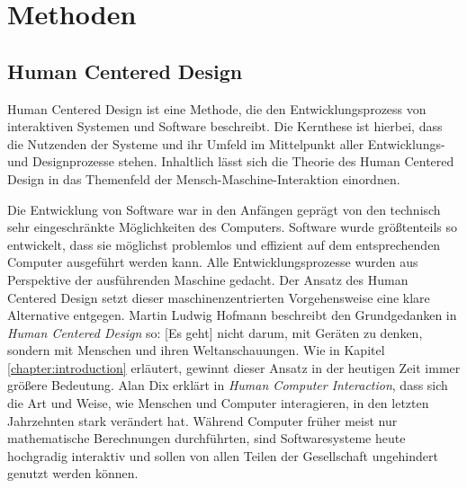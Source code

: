 \chapter{Methoden}
\label{chapter:methods}

\section{Human Centered Design}
Human Centered Design ist eine Methode, die den Entwicklungsprozess von
interaktiven Systemen und Software beschreibt. Die Kernthese ist hierbei, dass
die Nutzenden der Systeme und ihr Umfeld im Mittelpunkt aller Entwicklungs\hyphen\space und
Designprozesse stehen. Inhaltlich lässt sich die Theorie des Human Centered
Design in das Themenfeld der Mensch-Maschine-Interaktion
einordnen\cite{HMI-HCD}.

Die Entwicklung von Software war in den Anfängen geprägt von den technisch sehr
eingeschränkte Möglichkeiten des Computers. Software wurde größtenteils so
entwickelt, dass sie möglichst problemlos und effizient auf dem entsprechenden
Computer ausgeführt werden kann. Alle Entwicklungsprozesse wurden aus
Perspektive der ausführenden Maschine gedacht. Der Ansatz des Human Centered
Design setzt dieser maschinenzentrierten Vorgehensweise eine klare Alternative
entgegen. Martin Ludwig Hofmann beschreibt den Grundgedanken in \textit{Human
    Centered Design} so: \glqq{}[Es geht] nicht darum, mit Geräten zu denken,
sondern mit Menschen und ihren Weltanschauungen\grqq{}\cite{hcd}. Wie in
Kapitel \ref{chapter:introduction} erläutert, gewinnt dieser Ansatz in der
heutigen Zeit immer größere Bedeutung. Alan Dix erklärt in \textit{Human Computer
    Interaction}, dass sich die Art und Weise, wie Menschen und Computer
interagieren, in den letzten Jahrzehnten stark verändert hat. Während Computer
früher meist nur mathematische Berechnungen durchführten, sind Softwaresysteme
heute hochgradig interaktiv und sollen von allen Teilen der Gesellschaft
ungehindert genutzt werden können\cite{hci}.

